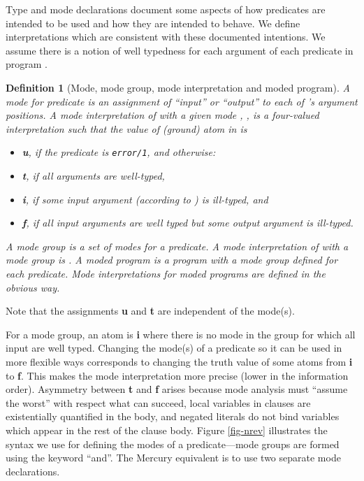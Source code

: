 \documentclass{tlp}
\newtheorem{definition}{Definition}
\begin{document}
Type and mode declarations document some aspects of how predicates are
intended to be used and how they are intended to behave.  We define
interpretations which are consistent with these documented intentions.
We assume there is a notion of well typedness for each argument of each
predicate in program .  


\begin{definition}[Mode, mode group, mode interpretation and moded
program] \rm
A \emph{mode} for predicate  is an assignment of ``input'' or 
``output'' to each of 's argument positions.
A \emph{mode interpretation} of  with a given mode , 
, is a four-valued interpretation 
such that the value of (ground) atom  in  is
\begin{itemize}
\item
\textbf{u}, if the predicate is \texttt{error/1}, and otherwise:
\item
\textbf{t}, if all arguments are well-typed,
\item
\textbf{i}, if some input argument (according to ) is ill-typed, and
\item
\textbf{f}, if all input arguments are well typed but some output
argument is ill-typed.
\end{itemize}
A \emph{mode group} is a set of modes for a predicate.  A \emph{mode
interpretation} of  with a mode group  is
.  A \emph{moded program}
is a program with a mode group defined for each predicate.  Mode
interpretations for moded programs are defined in the obvious way.
\end{definition}

Note that the assignments \textbf{u} and \textbf{t} are independent 
of the mode(s).

For a mode group, an atom is \textbf{i} where there is no mode in
the group for which all input are well typed.  Changing the mode(s) of a
predicate so it can be used in more flexible ways corresponds to changing
the truth value of some atoms from \textbf{i} to \textbf{f}.  This makes
the mode interpretation more precise (lower in the information order).
Asymmetry between \textbf{t} and \textbf{f} arises because mode
analysis must ``assume the worst'' with respect what can succeed, local
variables in clauses are existentially quantified in the body, and
negated literals do not bind variables which appear in the rest of the
clause body. 
Figure \ref{fig-nrev} illustrates the syntax we use for defining the
modes of a predicate---mode groups are formed using the keyword ``and''.
The Mercury equivalent is to use two separate mode declarations.
\end{document}
